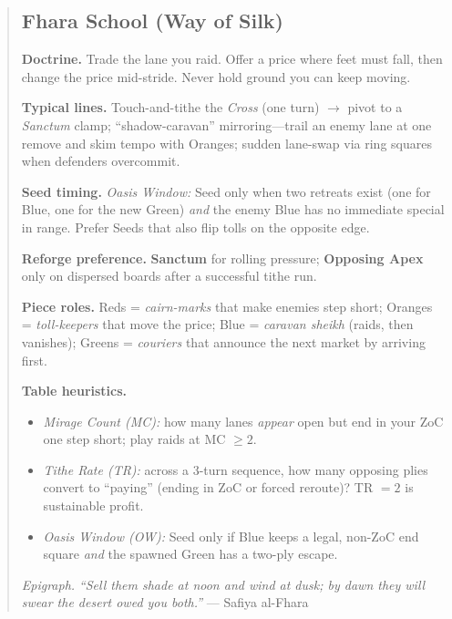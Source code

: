 \documentclass[11pt]{article}
\begin{document}
\begin{quote}
\clearpage
\subsection*{Fhara School (Way of Silk)}

\noindent\textbf{Doctrine.} Trade the lane you raid. Offer a price where feet must fall, then change the price mid-stride. Never hold ground you can keep moving.

\medskip
\noindent\textbf{Typical lines.} Touch-and-tithe the \emph{Cross} (one turn) $\rightarrow$ pivot to a \emph{Sanctum} clamp; “shadow-caravan” mirroring—trail an enemy lane at one remove and skim tempo with Oranges; sudden lane-swap via ring squares when defenders overcommit.

\medskip
\noindent\textbf{Seed timing.} \emph{Oasis Window:} Seed only when two retreats exist (one for Blue, one for the new Green) \emph{and} the enemy Blue has no immediate special in range. Prefer Seeds that also flip tolls on the opposite edge.

\medskip
\noindent\textbf{Reforge preference.} \textbf{Sanctum} for rolling pressure; \textbf{Opposing Apex} only on dispersed boards after a successful tithe run.

\medskip
\noindent\textbf{Piece roles.} Reds = \emph{cairn-marks} that make enemies step short; Oranges = \emph{toll-keepers} that move the price; Blue = \emph{caravan sheikh} (raids, then vanishes); Greens = \emph{couriers} that announce the next market by arriving first.

\medskip
\noindent\textbf{Table heuristics.}
\begin{itemize}[leftmargin=1.3em,itemsep=0.2em]
  \item \emph{Mirage Count (MC):} how many lanes \emph{appear} open but end in your ZoC one step short; play raids at MC $\ge 2$.
  \item \emph{Tithe Rate (TR):} across a 3-turn sequence, how many opposing plies convert to “paying” (ending in ZoC or forced reroute)? TR $= 2$ is sustainable profit.
  \item \emph{Oasis Window (OW):} Seed only if Blue keeps a legal, non-ZoC end square \emph{and} the spawned Green has a two-ply escape.
\end{itemize}

\medskip
\noindent\textit{Epigraph.} \emph{“Sell them shade at noon and wind at dusk; by dawn they will swear the desert owed you both.”} — Safiya al-Fhara


\end{quote}
\end{document}
